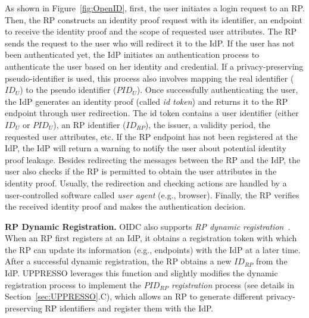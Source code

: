 As shown in Figure~\ref{fig:OpenID}, first, the user initiates a login request to an RP. Then, the RP constructs an identity proof request with its identifier, an endpoint to receive the identity proof and the scope of requested user attributes. The RP sends the request to the user who will redirect it to the IdP. If the user has not been authenticated yet, the IdP initiates an authentication process to authenticate the user based on her identity and credential. If a privacy-preserving pseudo-identifier is used, this process also involves mapping the real identifier ($ID_U$) to the pseudo identifier ($PID_U$). %
Once successfully authenticating the user, the IdP generates an identity proof (called {\em id token}) and returns it to the RP endpoint through user redirection. The id token contains a user identifier (either $ID_U$ or $PID_U$), an RP identifier ($ID_{RP}$), the issuer, a validity period, the requested user attributes, etc. If the RP endpoint has not been registered at the IdP, the IdP will return a warning to notify the user about potential identity proof leakage. Besides redirecting the messages between the RP and the IdP, the user also checks if the RP is permitted to obtain the user attributes in the identity proof. Usually, the redirection and checking actions are handled by a user-controlled software called {\em user agent} (e.g., browser). Finally, the RP verifies the received identity proof and makes the authentication decision.

\vspace{0.5mm}
\noindent\textbf{RP Dynamic Registration.}
OIDC also supports {\em RP dynamic registration}~\cite{DynamicRegistration}. When an RP first registers at an IdP, it obtains a registration token with which the RP can %
update its information (e.g., endpoints) with the IdP at a later time. After a successful dynamic registration, the RP obtains a new $ID_{RP}$ from the IdP.
UPPRESSO leverages this function and slightly modifies the dynamic registration process to implement the {\em $PID_{RP}$ registration} process (see details in Section~\ref{sec:UPPRESSO}.C), which allows an RP to generate different privacy-preserving RP identifiers and register them with the IdP.

